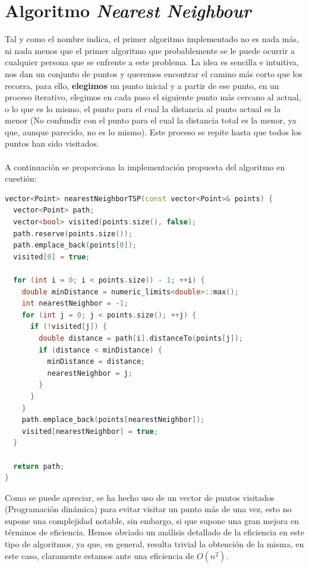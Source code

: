 \documentclass[11pt,openany]{book}
\begin{document}
\section{Algoritmo \textit{Nearest Neighbour}}
Tal y como el nombre indica, el primer algoritmo implementado no es nada más, ni 
nada menos que el primer algoritmo que probablemente se le puede ocurrir a cualquier
persona que se enfrente a este problema. La idea es sencilla e intuitiva, nos 
dan un conjunto de puntos y queremos encontrar el camino más corto que los recorra,
para ello, \textbf{elegimos} un punto inicial y a partir de ese punto, en un proceso 
iterativo, elegimos en cada paso el siguiente punto más cercano al actual, o lo que 
es lo mismo, el punto para el cual la distancia al punto actual es la menor (No confundir
con el punto para el cual la distancia total es la menor, ya que, aunque parecido, no es 
lo mismo). Este proceso se repite hasta que todos los puntos han sido visitados.
\\ \\
A continuación se proporciona la implementación propuesta del algoritmo en cuestión:
\begin{lstlisting}[language=C++]
vector<Point> nearestNeighborTSP(const vector<Point>& points) {
  vector<Point> path;
  vector<bool> visited(points.size(), false);
  path.reserve(points.size());
  path.emplace_back(points[0]);
  visited[0] = true;

  for (int i = 0; i < points.size() - 1; ++i) {
    double minDistance = numeric_limits<double>::max();
    int nearestNeighbor = -1;
    for (int j = 0; j < points.size(); ++j) {
      if (!visited[j]) {
        double distance = path[i].distanceTo(points[j]);
        if (distance < minDistance) {
          minDistance = distance;
          nearestNeighbor = j;
        }
      }
    }
    path.emplace_back(points[nearestNeighbor]);
    visited[nearestNeighbor] = true;
  }

  return path;
}
\end{lstlisting}
Como se puede apreciar, se ha hecho uso de un vector de puntos visitados (Programación 
dinámica) para evitar visitar un punto más de una vez, esto no supone una complejidad
notable, sin embargo, si que supone una gran mejora en términos de eficiencia. Hemos obviado
un análisis detallado de la eficiencia en este tipo de algoritmos, ya que, en general, resulta
trivial la obtención de la misma, en este caso, claramente estamos ante una eficiencia de
$O(n^2)$.
\end{document}
